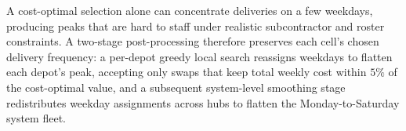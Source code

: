 \documentclass[preprint,12pt,authoryear]{elsarticle}
\begin{document}
A cost-optimal selection alone can concentrate deliveries on a few weekdays, producing peaks that are hard to staff under realistic subcontractor and roster constraints. A two-stage post-processing therefore preserves each cell's chosen delivery frequency: a per-depot greedy local search reassigns weekdays to flatten each depot's peak, accepting only swaps that keep total weekly cost within $5\%$ of the cost-optimal value, and a subsequent system-level smoothing stage redistributes weekday assignments across hubs to flatten the Monday-to-Saturday system fleet.














\end{document}
